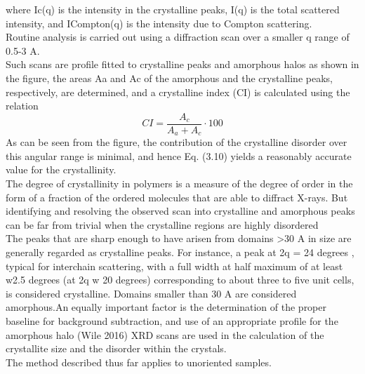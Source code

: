 where Ic(q) is the intensity in the crystalline peaks, I(q) is the total scattered
intensity, and ICompton(q) is the intensity due to Compton scattering.\\
Routine analysis is carried out using a diffraction
scan over a smaller q range of 0.5-3 A.\\
Such scans are profile fitted to crystalline peaks and amorphous halos
as shown in the figure, the areas Aa and Ac of the amorphous and the crystalline
peaks, respectively, are determined, and a crystalline index (CI) is calculated using
the relation
\[
CI = \frac{A_c}{A_a+A_c} \cdot 100
\]
As can be seen from the figure, the contribution of the crystalline disorder over this
angular range is minimal, and hence Eq. (3.10) yields a reasonably accurate value for
the crystallinity.\\
The degree of crystallinity in polymers is a measure of the degree of order in the
form of a fraction of the ordered molecules that are able to diffract X-rays. But
identifying and resolving the observed scan into crystalline and amorphous peaks
can be far from trivial when the crystalline regions are highly disordered\\
The peaks that are sharp enough to have arisen from domains >30 A
in size are
generally regarded as crystalline peaks. For instance, a peak at 2q = 24 degrees , typical for interchain scattering, with a full width at half maximum of at least w2.5 degrees (at 2q w 20 degrees) corresponding to about
three to five unit cells, is considered crystalline. Domains smaller than 30 A are considered amorphous.An equally important factor is the determination of the
proper baseline for background subtraction, and use of an appropriate profile for
the amorphous halo (Wile 2016)
XRD scans are used in the calculation of
the crystallite size and the disorder within the crystals.\\
The method described thus far applies to unoriented samples.\\

